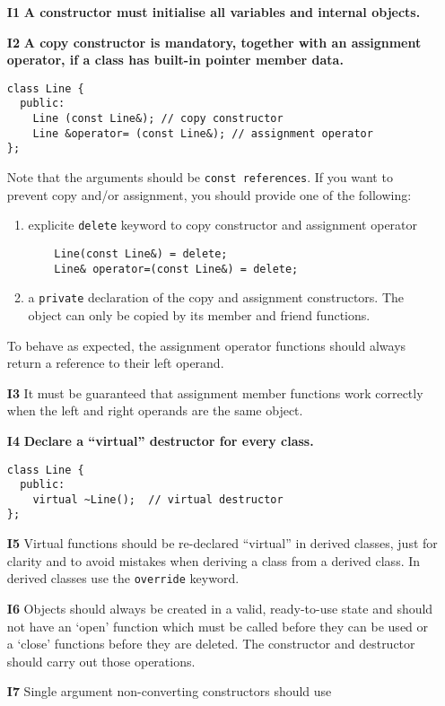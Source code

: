 \documentclass[a4paper,10pt]{article}
\begin{document}
\begin{itemize}
\item[\bf I1] {\bf A constructor must initialise all variables and internal
  objects.}
\item[\bf I2] {\bf A copy constructor is mandatory, together with an assignment
  operator, if a class has built-in pointer member data.}
  \begin{verbatim}
class Line {
  public:
    Line (const Line&); // copy constructor
    Line &operator= (const Line&); // assignment operator
};
  \end{verbatim}
  Note that the arguments should be {\tt const references}. If you want to
  prevent copy and/or assignment, you should provide one of the following:
  \begin{enumerate}
   \item explicite {\tt delete} keyword to copy constructor and assignment operator\\
   \begin{verbatim}
    Line(const Line&) = delete;
    Line& operator=(const Line&) = delete;
   \end{verbatim}
   \item a {\tt private} declaration of the copy and assignment constructors.
   The object can only be copied by its member and friend functions.
  \end{enumerate}
  To behave as expected, the assignment operator functions should always
  return a reference to their left operand.
\item[\bf I3] It must be guaranteed that assignment member functions work
  correctly when the left and right operands are the same object.
\item[\bf I4] {\bf Declare a ``virtual'' destructor for every class.}
  \begin{verbatim}
class Line {
  public:
    virtual ~Line();  // virtual destructor
};
  \end{verbatim}
\item[\bf I5] Virtual functions should be re-declared ``virtual'' in derived
  classes, just for clarity and to avoid mistakes when deriving a class from
  a derived class. In derived classes use the {\tt override} keyword.
\item[\bf I6] Objects should always be created in a valid, ready-to-use state
  and should not have an `open' function which must be called
  before they can be used or a `close' functions before they are deleted.
  The constructor and destructor should carry out those operations.
\item[\bf I7] Single argument non-converting constructors should use

\end{itemize}
\end{document}
